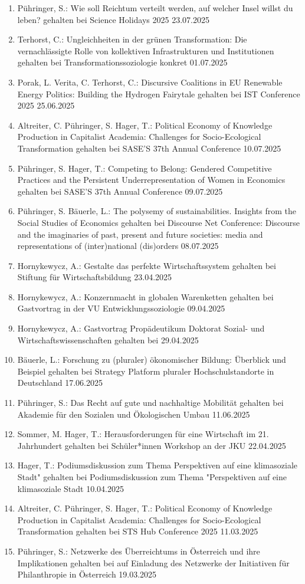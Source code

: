 \begin{enumerate}
	\item Pühringer, S.: Wie soll Reichtum verteilt werden, auf welcher Insel willst du leben? gehalten bei Science Holidays 2025 23.07.2025
	\item Terhorst, C.: Ungleichheiten in der grünen Transformation: Die vernachlässigte Rolle von kollektiven Infrastrukturen und Institutionen gehalten bei Transformationssoziologie konkret 01.07.2025
	\item Porak, L. Verita, C. Terhorst, C.: Discursive Coalitions in EU Renewable Energy Politics: Building the Hydrogen Fairytale gehalten bei IST Conference 2025 25.06.2025
	\item Altreiter, C. Pühringer, S. Hager, T.: Political Economy of Knowledge Production in Capitalist Academia: Challenges for Socio-Ecological Transformation gehalten bei SASE'S 37th Annual Conference 10.07.2025
	\item Pühringer, S. Hager, T.: Competing to Belong: Gendered Competitive Practices and the Persistent Underrepresentation of Women in Economics gehalten bei SASE'S 37th Annual Conference 09.07.2025
	\item Pühringer, S. Bäuerle, L.: The polysemy of sustainabilities. Insights from the Social Studies of Economics gehalten bei Discourse Net Conference: Discourse and the imaginaries of past, present and future societies: media and representations of (inter)national (dis)orders 08.07.2025
	\item Hornykewycz, A.: Gestalte das perfekte Wirtschaftssystem gehalten bei Stiftung für Wirtschaftsbildung 23.04.2025
	\item Hornykewycz, A.: Konzernmacht in globalen Warenketten gehalten bei Gastvortrag in der VU Entwicklungssoziologie 09.04.2025
	\item Hornykewycz, A.: Gastvortrag Propädeutikum Doktorat Sozial- und Wirtschaftswissenschaften gehalten bei  29.04.2025
	\item Bäuerle, L.: Forschung zu (pluraler) ökonomischer Bildung: Überblick und Beispiel gehalten bei Strategy Platform pluraler Hochschulstandorte in Deutschland 17.06.2025
	\item Pühringer, S.: Das Recht auf gute und nachhaltige Mobilität gehalten bei Akademie für den Sozialen und Ökologischen Umbau 11.06.2025
	\item Sommer, M. Hager, T.: Herausforderungen für eine Wirtschaft im 21. Jahrhundert gehalten bei Schüler*innen Workshop an der JKU 22.04.2025
	\item Hager, T.: Podiumsdiskussion zum Thema ﻿﻿\glqq Perspektiven auf eine klimasoziale Stadt" gehalten bei Podiumsdiskussion zum Thema "Perspektiven auf eine klimasoziale Stadt\grqq{} 10.04.2025
	\item Altreiter, C. Pühringer, S. Hager, T.: Political Economy of Knowledge Production in Capitalist Academia: Challenges for Socio-Ecological Transformation gehalten bei STS Hub Conference 2025 11.03.2025
	\item Pühringer, S.: Netzwerke des Überreichtums in Österreich und ihre Implikationen gehalten bei auf Einladung des Netzwerke der Initiativen für Philanthropie in Österreich 19.03.2025
\end{enumerate}
